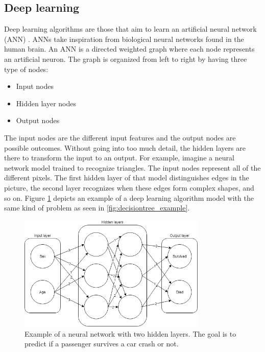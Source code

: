 	\subsection{Deep learning}
			Deep learning algorithms are those that aim to learn an artificial neural network (ANN) \cite{BOOK:6}. ANNs take inspiration from biological neural networks found in the human brain. An ANN is a directed weighted graph where each node represents an artificial neuron. The graph is organized from left to right by having three type of nodes:
	\begin{itemize}
		\item Input nodes
		\item Hidden layer nodes
		\item Output nodes
	\end{itemize}
			The input nodes are the different input features and the output nodes are possible outcomes. Without going into too much detail, the hidden layers are there to transform the input to an output. For example, imagine a neural network model trained to recognize triangles. The input nodes represent all of the different pixels. The first hidden layer of that model distinguishes edges in the picture, the second layer recognizes when these edges form complex shapes, and so on. Figure \ref{fig:neuralnetwork_example} depicts an example of a deep learning algorithm model with the same kind of problem as seen in \ref{fig:decisiontree_example}.

\begin{figure}[H] 
	\centering
	\includegraphics[width=0.8\textwidth]{media/neuralnetwork_ex.png}
	\caption{Example of a neural network with two hidden layers. The goal is to predict if a passenger survives a car crash or not.}
	\label{fig:neuralnetwork_example}
\end{figure}

